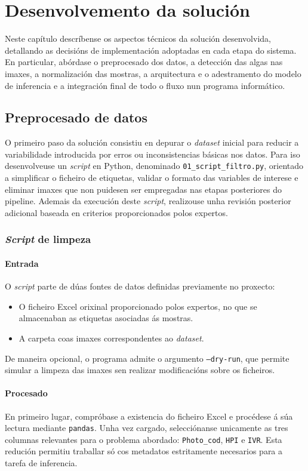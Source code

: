 \chapter{Desenvolvemento da solución}
\label{chap:desenvolvemento-solucion}

Neste capítulo descríbense os aspectos técnicos da solución desenvolvida, detallando as decisións de
implementación adoptadas en cada etapa do sistema. En particular, abórdase o preprocesado dos datos,
a detección das algas nas imaxes, a normalización das mostras, a arquitectura e o adestramento do
modelo de inferencia e a integración final de todo o fluxo nun programa informático.

\section{Preprocesado de datos}
O primeiro paso da solución consistiu en depurar o \textit{dataset} inicial para reducir a
variabilidade introducida por erros ou inconsistencias básicas nos datos. Para iso desenvolveuse un
\textit{script} en Python, denominado \texttt{01\_script\_filtro.py}, orientado a simplificar o
ficheiro de etiquetas, validar o formato das variables de interese e eliminar imaxes que non puidesen
ser empregadas nas etapas posteriores do pipeline. Ademais da execución deste \textit{script},
realizouse unha revisión posterior adicional baseada en criterios proporcionados polos expertos.

\subsection{\textit{Script} de limpeza}
\subsubsection{Entrada}
O \textit{script} parte de dúas fontes de datos definidas previamente no proxecto:
\begin{itemize}
    \item O ficheiro Excel orixinal proporcionado polos expertos, no que se almacenaban as etiquetas asociadas ás mostras.
    \item A carpeta coas imaxes correspondentes ao \textit{dataset}.
\end{itemize}
De maneira opcional, o programa admite o argumento \texttt{--dry-run}, que permite simular a
limpeza das imaxes sen realizar modificacións sobre os ficheiros.

\subsubsection{Procesado}
En primeiro lugar, compróbase a existencia do ficheiro Excel e procédese á súa lectura mediante
\texttt{pandas}. Unha vez cargado, selecciónanse unicamente as tres columnas relevantes para o
problema abordado: \texttt{Photo\_cod}, \texttt{HPI} e \texttt{IVR}. Esta redución permitiu
traballar só cos metadatos estritamente necesarios para a tarefa de inferencia.

